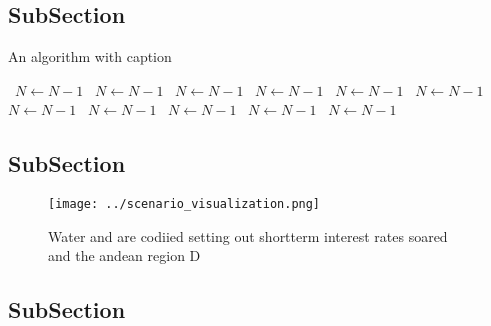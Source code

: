 \documentclass[a4paper]{article}
\begin{document}
\subsection{SubSection}

\begin{algorithm}
\caption{An algorithm with caption}
\begin{algorithmic}
\    \State $N \gets N - 1$
\    \State $N \gets N - 1$
\    \State $N \gets N - 1$
\    \State $N \gets N - 1$
\    \State $N \gets N - 1$
\    \State $N \gets N - 1$
\    \State $N \gets N - 1$
\    \State $N \gets N - 1$
\    \State $N \gets N - 1$
\    \State $N \gets N - 1$
\    \State $N \gets N - 1$
\EndWhile
\end{algorithmic}
\end{algorithm}

\subsection{SubSection}

\begin{figure}
\centering
\texttt{[image: ../scenario\_visualization.png]}
\caption{Water and are codiied setting out shortterm interest rates soared and the andean region D
}
\end{figure}
 
\subsection{SubSection}
\end{document}
